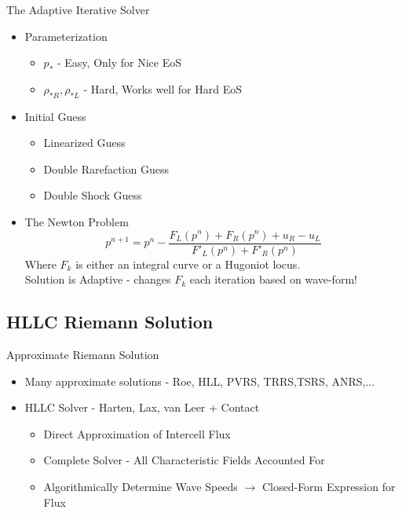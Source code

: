 \documentclass{beamer}
\newcommand{\bq}{\begin{equation}}
\newcommand{\eq}{\end{equation}}
\begin{document}
\begin{frame}{The Adaptive Iterative Solver}
\begin{itemize}

\item Parameterization
\begin{itemize}
\item $p_*$ - Easy, Only for Nice EoS
\item $\rho_{*R},\rho_{*L}$ - Hard, Works well for Hard EoS
\end{itemize}
\item Initial Guess
\begin{itemize}
\item Linearized Guess
\item Double Rarefaction Guess
\item Double Shock Guess
\end{itemize}

\item The Newton Problem
\bq p^{n+1}=p^n-\frac{F_L(p^n)+F_R(p^n)+u_R-u_L}{F'_L(p^n)+F'_R(p^n)}\eq
Where $F_k$ is either an integral curve or a Hugoniot locus.\\
Solution is Adaptive - changes $F_k$ each iteration based on wave-form!
\end{itemize}
\end{frame}

\subsection{HLLC Riemann Solution}
\begin{frame}{Approximate Riemann Solution}
\begin{itemize}
\item Many approximate solutions - Roe, HLL, PVRS, TRRS,TSRS, ANRS,...
\item HLLC Solver - Harten, Lax, van Leer + Contact
\begin{itemize}
\item Direct Approximation of Intercell Flux
\item Complete Solver - All Characteristic Fields Accounted For
\item Algorithmically Determine Wave Speeds $\rightarrow$ Closed-Form Expression for Flux
\end{itemize}
\end{itemize}
\end{frame}
\end{document}
